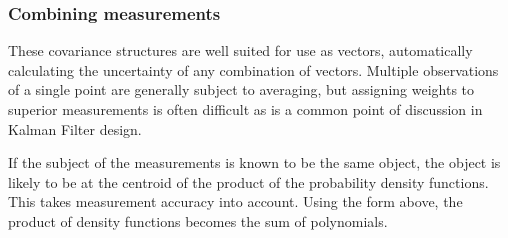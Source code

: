 \documentclass[a4paper, 11pt, titlepage]{article}
\begin{document}
    \subsubsection{Combining measurements}
      These covariance structures are well suited for use as vectors, automatically calculating the uncertainty of any combination of vectors. 
      Multiple observations of a single point are generally subject to averaging, but assigning weights to superior measurements is often difficult as is a common point of discussion in Kalman Filter design.
      
      If the subject of the measurements is known to be the same object, the object is likely to be at the centroid of the product of the probability density functions.  This takes measurement accuracy into account.
      Using the form above, the product of density functions becomes the sum of polynomials.
\end{document}
